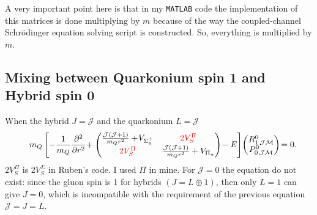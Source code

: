 \documentclass[11pt, a4paper]{article}
\begin{document}
A very important point here is that in my \texttt{MATLAB} code the implementation of this matrices is done multiplying by $m$ because of the way the coupled-channel Schrödinger equation solving script is constructed. So, everything is multiplied by $m$.

\subsection{Mixing between Quarkonium spin 1 and Hybrid spin 0}
When the hybrid $J=\mathcal{J}$ and the quarkonium $L=\mathcal{J}$
{
\begin{eqnarray}
\label{mat_H04} 
&& 	m_Q\left[ 
 -\frac{1}{m_Q}\frac{\partial^2}{\partial r^2}\!    
	+ \begin{pmatrix}
 		\frac{\mathcal{J}(\mathcal{J}+1)}{m_Q r^2}+\!V_{\Sigma_g^+}  & {\color{red}2V_S^\Pi}                    \\
 		{\color{red}2V_S^\Pi}  & 	\frac{\mathcal{J}(\mathcal{J}+1)}{m_Q r^2}+V_{\Pi_u}                   \\
 	\end{pmatrix}
 	\!
 	-E \right]\! 
	\begin{pmatrix}
 		R_{1\, \mathcal{J}\mathcal{M}}^{0}\\
 		P_{0\, \mathcal{J}\mathcal{M}}^{0} \\
 	\end{pmatrix}\!
 	=0.
\end{eqnarray}
}
{\color{red} $2V_S^\Pi$ is $2V_S^\Sigma$ in Ruben's code. I used $\Pi$ in mine.}
    For $\mathcal{J}= 0$ the equation do not exist: since the gluon spin is 1 for hybrids $(J=L  \oplus 1)$, then only $L=1$ can give $J=0$, which is incompatible with the requirement of the  previous equation $\mathcal{J}=J=L$. \\
    
\end{document}
